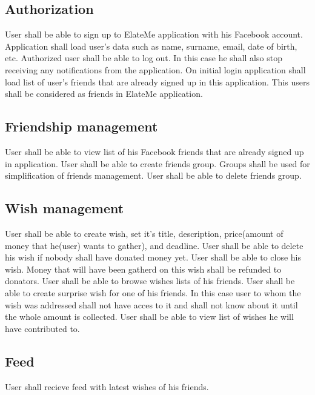 \subsection{Authorization}
User shall be able to sign up to ElateMe application with his Facebook account. Application shall load user's data
such as name, surname, email, date of birth, etc.
Authorized user shall be able to log out. In this case he shall also stop receiving any notifications from the
application.
On initial login application shall load list of user's friends that are already signed up in this application. This
users shall be considered as friends in ElateMe application.

\subsection{Friendship management}
User shall be able to view list of his Facebook friends that are already signed up in application.
User shall be able to create friends group. Groups shall be used for simplification of friends management.
User shall be able to delete friends group.

\subsection{Wish management}
User shall be able to create wish, set it's title, description, price(amount of money that he(user) wants to gather),
and deadline.
User shall be able to delete his wish if nobody shall have donated money yet.
User shall be able to close his wish. Money that will have been gatherd on this wish shall be refunded to donators.
User shall be able to browse wishes lists of his friends.
User shall be able to create surprise wish for one of his friends. In this case user to whom the wish was addressed
shall not have acces to it and shall not know about it until the whole amount is collected.
User shall be able to view list of wishes he will have contributed to.

\subsection{Feed}
User shall recieve feed with latest wishes of his friends.

